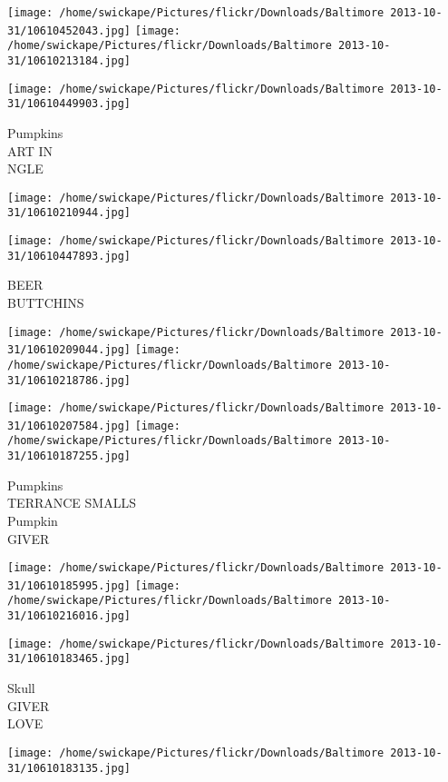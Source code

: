 \documentclass[10pt,letterpaper]{article}
\begin{document}
\texttt{[image: /home/swickape/Pictures/flickr/Downloads/Baltimore 2013-10-31/10610452043.jpg]}
\texttt{[image: /home/swickape/Pictures/flickr/Downloads/Baltimore 2013-10-31/10610213184.jpg]}

\texttt{[image: /home/swickape/Pictures/flickr/Downloads/Baltimore 2013-10-31/10610449903.jpg]}

Pumpkins\\
ART IN\\
NGLE\\
\pagebreak

\texttt{[image: /home/swickape/Pictures/flickr/Downloads/Baltimore 2013-10-31/10610210944.jpg]}

\vspace{0.25in}
\texttt{[image: /home/swickape/Pictures/flickr/Downloads/Baltimore 2013-10-31/10610447893.jpg]}

BEER\\
BUTTCHINS\\
\pagebreak

\texttt{[image: /home/swickape/Pictures/flickr/Downloads/Baltimore 2013-10-31/10610209044.jpg]}
\texttt{[image: /home/swickape/Pictures/flickr/Downloads/Baltimore 2013-10-31/10610218786.jpg]}

\texttt{[image: /home/swickape/Pictures/flickr/Downloads/Baltimore 2013-10-31/10610207584.jpg]}
\texttt{[image: /home/swickape/Pictures/flickr/Downloads/Baltimore 2013-10-31/10610187255.jpg]}

Pumpkins\\
TERRANCE SMALLS\\
Pumpkin\\
GIVER\\
\pagebreak

\texttt{[image: /home/swickape/Pictures/flickr/Downloads/Baltimore 2013-10-31/10610185995.jpg]}
\texttt{[image: /home/swickape/Pictures/flickr/Downloads/Baltimore 2013-10-31/10610216016.jpg]}

\texttt{[image: /home/swickape/Pictures/flickr/Downloads/Baltimore 2013-10-31/10610183465.jpg]}

Skull\\
GIVER\\
LOVE\\
\pagebreak

\texttt{[image: /home/swickape/Pictures/flickr/Downloads/Baltimore 2013-10-31/10610183135.jpg]}
\end{document}
